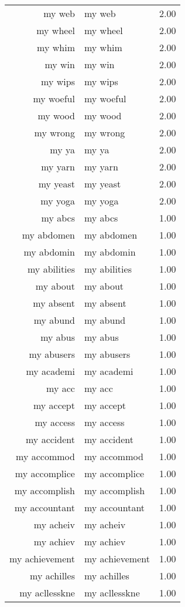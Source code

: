 \begin{table}[ht]
\begin{tabular}{rlr}
  my web & my web & 2.00 \\ 
  my wheel & my wheel & 2.00 \\ 
  my whim & my whim & 2.00 \\ 
  my win & my win & 2.00 \\ 
  my wips & my wips & 2.00 \\ 
  my woeful & my woeful & 2.00 \\ 
  my wood & my wood & 2.00 \\ 
  my wrong & my wrong & 2.00 \\ 
  my ya & my ya & 2.00 \\ 
  my yarn & my yarn & 2.00 \\ 
  my yeast & my yeast & 2.00 \\ 
  my yoga & my yoga & 2.00 \\ 
  my abcs & my abcs & 1.00 \\ 
  my abdomen & my abdomen & 1.00 \\ 
  my abdomin & my abdomin & 1.00 \\ 
  my abilities & my abilities & 1.00 \\ 
  my about & my about & 1.00 \\ 
  my absent & my absent & 1.00 \\ 
  my abund & my abund & 1.00 \\ 
  my abus & my abus & 1.00 \\ 
  my abusers & my abusers & 1.00 \\ 
  my academi & my academi & 1.00 \\ 
  my acc & my acc & 1.00 \\ 
  my accept & my accept & 1.00 \\ 
  my access & my access & 1.00 \\ 
  my accident & my accident & 1.00 \\ 
  my accommod & my accommod & 1.00 \\ 
  my accomplice & my accomplice & 1.00 \\ 
  my accomplish & my accomplish & 1.00 \\ 
  my accountant & my accountant & 1.00 \\ 
  my acheiv & my acheiv & 1.00 \\ 
  my achiev & my achiev & 1.00 \\ 
  my achievement & my achievement & 1.00 \\ 
  my achilles & my achilles & 1.00 \\ 
  my acllesskne & my acllesskne & 1.00 \\ 

\end{tabular}
\end{table}
